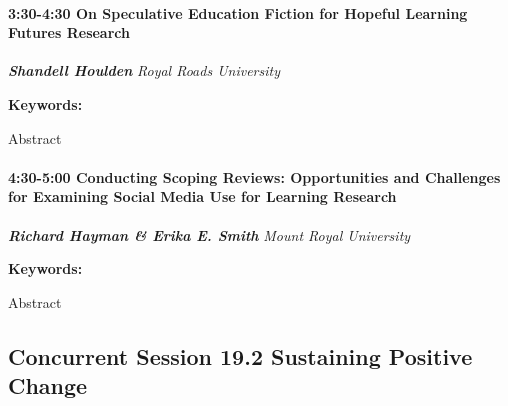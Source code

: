 \documentclass[
]{book}
\begin{document}
\begin{session}
\hypertarget{on-speculative-education-fiction-for-hopeful-learning-futures-research}{%
\paragraph*{\texorpdfstring{3:30-4:30 \textbar{} \textbf{On Speculative
Education Fiction for Hopeful Learning Futures} \textbar{}
Research}{3:30-4:30 \textbar{} On Speculative Education Fiction for Hopeful Learning Futures \textbar{} Research}}\label{on-speculative-education-fiction-for-hopeful-learning-futures-research}}

\textbf{\emph{Shandell Houlden}} \textbar{} \emph{Royal Roads
University}

\textbf{Keywords:}

Abstract
\end{session}

\begin{session}
\hypertarget{conducting-scoping-reviews-opportunities-and-challenges-for-examining-social-media-use-for-learning-research}{%
\paragraph*{\texorpdfstring{4:30-5:00 \textbar{} \textbf{Conducting
Scoping Reviews: Opportunities and Challenges for Examining Social Media
Use for Learning} \textbar{}
Research}{4:30-5:00 \textbar{} Conducting Scoping Reviews: Opportunities and Challenges for Examining Social Media Use for Learning \textbar{} Research}}\label{conducting-scoping-reviews-opportunities-and-challenges-for-examining-social-media-use-for-learning-research}}

\textbf{\emph{Richard Hayman \& Erika E. Smith}} \textbar{} \emph{Mount
Royal University}

\textbf{Keywords:}

Abstract
\end{session}

\hypertarget{concurrent-session-19.2-sustaining-positive-change}{%
\subsection*{Concurrent Session 19.2 \textbar{} Sustaining Positive Change}\label{concurrent-session-19.2-sustaining-positive-change}}
\end{document}
